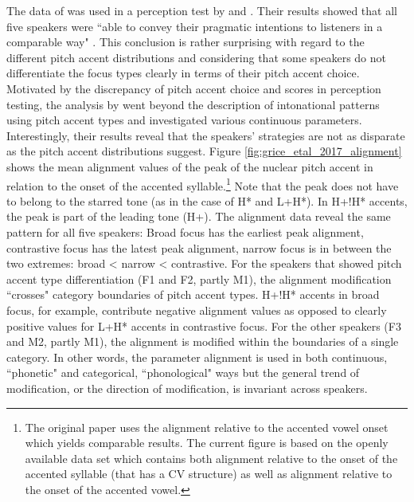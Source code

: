 The data of \citet{Griceetal2017} was used in a perception test by \citet{CangemiKrügerGrice2015} and \citet{Krüger2009}. Their results showed that all five speakers were ``able to convey their pragmatic intentions to listeners in a comparable way" \citep[91]{Griceetal2017}. This conclusion is rather surprising with regard to the different pitch accent distributions and considering that some speakers do not differentiate the focus types clearly in terms of their pitch accent choice. Motivated by the discrepancy of pitch accent choice and scores in perception testing, the analysis by \citet{Griceetal2017} went beyond the description of intonational patterns using pitch accent types and investigated various continuous parameters. Interestingly, their results reveal that the speakers' strategies are not as disparate as the pitch accent distributions suggest. Figure \ref{fig:grice_etal_2017_alignment} shows the mean alignment values of the peak of the nuclear pitch accent in relation to the onset of the accented syllable.\footnote{The original paper uses the alignment relative to the accented vowel onset which yields comparable results. The current figure is based on the openly available data set which contains both alignment relative to the onset of the accented syllable (that has a CV structure) as well as alignment relative to the onset of the accented vowel.} Note that the peak does not have to belong to the starred tone (as in the case of H* and L+H*). In H+!H* accents, the peak is part of the leading tone (H+). The alignment data reveal the same pattern for all five speakers: Broad focus has the earliest peak alignment, contrastive focus has the latest peak alignment, narrow focus is in between the two extremes: broad < narrow < contrastive. For the speakers that showed pitch accent type differentiation (F1 and F2, partly M1), the alignment modification ``crosses" category boundaries of pitch accent types. H+!H* accents in broad focus, for example, contribute negative alignment values as opposed to clearly positive values for L+H* accents in contrastive focus. For the other speakers (F3 and M2, partly M1), the alignment is modified within the boundaries of a single category. In other words, the parameter alignment is used in both continuous, ``phonetic" and categorical, ``phonological" ways but the general trend of modification, or the direction of modification, is invariant across speakers.

